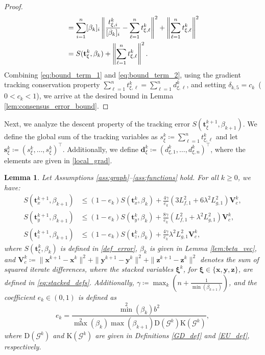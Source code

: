 \documentclass{article}
\theoremstyle{plain}
\newtheorem{lemma}[theorem]{Lemma}
\theoremstyle{definition}
\theoremstyle{remark}
\begin{document}
\begin{proof}
\begin{align}
    &= \sum_{i=1}^{n}[\beta_{k}]_{i}\left\|\frac{t_{\xi,i}^{k}}{[\beta_{k}]_{i}}-\sum_{\ell=1}^nt_{\xi,\ell}^k\right\|^{2} + \left\|\sum_{\ell=1}^nt_{\xi,\ell}^k\right\|^{2} \notag \\
    &= S(\mathbf{t}_{\xi}^{k},\beta_{k}) + \left\|\sum_{\ell=1}^n t_{\xi,\ell}^k\right\|^{2}.
\end{align}
Combining \eqref{eq:bound_term_1} and \eqref{eq:bound_term_2}, using the gradient tracking conservation property $\sum_{\ell=1}^n t_{\xi,\ell}^k = \sum_{\ell=1}^n d_{\xi,\ell}^k$, and setting $\delta_{k,5}=c_k$~($0<c_k<1$), we arrive at the desired bound in Lemma \ref{lem:consensus_error_bound}.

\end{proof}
Next, we analyze the descent property of the tracking error $S(\mathbf{t}_{\xi}^{k+1},\beta_{k+1})$. We define the global sum of the tracking variables as $s_{\xi}^{k} \coloneqq \sum_{\ell=1}^{n}t_{\xi,\ell}^{k}$ and let $\mathbf{s}_{\xi}^{k} \coloneqq (s_{\xi}^{k},\ldots,s_{\xi}^{k})^\top$. Additionally, we define $\mathbf{d}_{\xi}^{k} \coloneqq (d_{\xi,1}^{k}, \ldots, d_{\xi,n}^{k})^\top$, where the elements are given in \eqref{local_grad}.
\begin{lemma}\label{lem:tracking_error_bound}
    Let Assumptions \ref{ass:graph}--\ref{ass:functions} hold. For all $k \geq 0$, we have:
    \begin{align}
        S(\mathbf{t}_{x}^{k+1},\beta_{k+1}) &\leq (1-e_k)S(\mathbf{t}_{x}^{k},\beta_{k}) + \frac{4\gamma}{e_k}(3L_{f,1}^{2}+6\lambda^{2}L_{g,1}^{2}) \mathbf{V}_{c}^{k}, \\
        S(\mathbf{t}_{y}^{k+1},\beta_{k+1}) &\leq (1-e_k)S(\mathbf{t}_{y}^{k},\beta_{k}) + \frac{8\gamma}{e_k} (L_{f,1}^{2}+\lambda^{2}L_{g,1}^{2}) \mathbf{V}_{c}^{k}, \\
        S(\mathbf{t}_{z}^{k+1},\beta_{k+1}) &\leq (1-e_k)S(\mathbf{t}_{z}^{k},\beta_{k}) + \frac{4\gamma}{e_k} \lambda^{2}L_{g,1}^{2} \mathbf{V}_{c}^{k},
    \end{align}
    where $S(\mathbf{t}_{\xi}^{k},\beta_{k})$ is defined in \eqref{def_error}, $\beta_{k}$ is given in Lemma \ref{lem:beta_vec}, and $\mathbf{V}_{c}^{k} \coloneqq \|\mathbf{x}^{k+1}-\mathbf{x}^{k}\|^{2} + \|\mathbf{y}^{k+1}-\mathbf{y}^{k}\|^{2} + \|\mathbf{z}^{k+1}-\mathbf{z}^{k}\|^{2}$ denotes the sum of squared iterate differences, where the stacked variables $\boldsymbol{\xi}^{k}$, for $\boldsymbol{\xi} \in \{\mathbf{x}, \mathbf{y}, \mathbf{z}\}$, are defined in \eqref{eq:stacked_defs}. Additionally, $\gamma \coloneqq \max_{k}(n+\frac{1}{\min(\beta_{k+1})})$, and the coefficient $e_{k} \in (0,1)$ is defined as
    \[
        e_{k} = \frac{\min^{2}(\beta_{k}) b^{2}}{\max^{2}(\beta_{k})\max(\beta_{k+1}) \mathrm{D}(\mathcal{G}^{k})\mathrm{K}(\mathcal{G}^{k})},
    \]
    where $\mathrm{D}(\mathcal{G}^{k})$ and $\mathrm{K}(\mathcal{G}^{k})$ are given in Definitions \ref{GD_def} and \ref{EU_def}, respectively.
\end{lemma}
\end{document}
